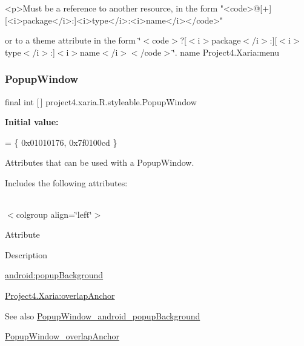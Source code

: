 \begin{DoxyVerb}      <p>Must be a reference to another resource, in the form "<code>@[+][<i>package</i>:]<i>type</i>:<i>name</i></code>"
\end{DoxyVerb}
 or to a theme attribute in the form \char`\"{}$<$code$>$?\mbox{[}$<$i$>$package$<$/i$>$\+:\mbox{]}\mbox{[}$<$i$>$type$<$/i$>$\+:\mbox{]}$<$i$>$name$<$/i$>$$<$/code$>$\char`\"{}.  name Project4.\+Xaria\+:menu \mbox{\label{classproject4_1_1xaria_1_1R_1_1styleable_a55b1ea3ea17bd2c0ca0038ad45c86e31}} 
\subsubsection{\texorpdfstring{Popup\+Window}{PopupWindow}}
{\footnotesize\ttfamily final int \mbox{[}$\,$\mbox{]} project4.\+xaria.\+R.\+styleable.\+Popup\+Window\hspace{0.3cm}{\ttfamily [static]}}

{\bfseries Initial value\+:}
\begin{DoxyCode}
= \{
            0x01010176, 0x7f0100cd
        \}
\end{DoxyCode}
Attributes that can be used with a Popup\+Window. 

Includes the following attributes\+:

\tabulinesep=1mm
\begin{longtabu} spread 0pt [c]{*{0}{|X[-1]}|}
\hline
\end{longtabu}
$<$colgroup align=\char`\"{}left\char`\"{}$>$ 

Attribute

Description 

{\ttfamily \hyperlink{classproject4_1_1xaria_1_1R_1_1styleable_a6b38610b172bbd2b9759f5aec018238a}{android\+:popup\+Background}}

{\ttfamily \hyperlink{classproject4_1_1xaria_1_1R_1_1styleable_acfb6ddfbcd2513d18991d64cf7f6f54d}{Project4.\+Xaria\+:overlap\+Anchor}}

\begin{DoxySeeAlso}{See also}
\hyperlink{classproject4_1_1xaria_1_1R_1_1styleable_a6b38610b172bbd2b9759f5aec018238a}{Popup\+Window\+\_\+android\+\_\+popup\+Background} 

\hyperlink{classproject4_1_1xaria_1_1R_1_1styleable_acfb6ddfbcd2513d18991d64cf7f6f54d}{Popup\+Window\+\_\+overlap\+Anchor} 
\end{DoxySeeAlso}
\mbox{\label{classproject4_1_1xaria_1_1R_1_1styleable_a6b38610b172bbd2b9759f5aec018238a}} 
